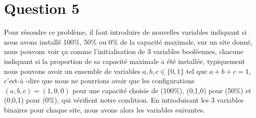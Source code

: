 \documentclass{article}
\begin{document}
\newpage
\section*{Question 5}
Pour résoudre ce problème, il faut introduire de nouvelles variables indiquant si nous avons installé
100\%, 50\% ou 0\% de la capacité maximale, sur un site donné, nous pouvons voir ça comme l'initialisation
de 3 variables booléennes, chacune indiquant si la proportion de sa capacité maximale a été installée,
typiquement nous pouvons avoir un ensemble de variables $a,b,c \in \{ 0,1\}$ tel que $a + b + c = 1$, c'est-à
-dire que nous ne pourrions avoir que les configurations $(a,b,c) = (1,0,0)$ pour une capacité choisie de (100\%), (0,1,0) pour (50\%) et (0,0,1) pour (0\%), 
qui vérifient notre condition. En introduisant les 3 variables binaires pour chaque site, nous avons alors les variables suivantes.
\end{document}
